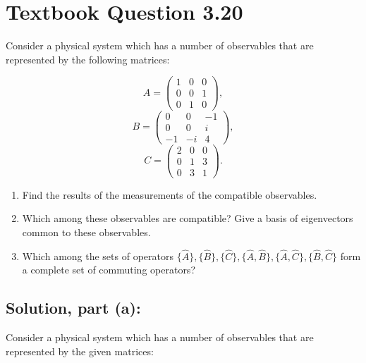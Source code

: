 \documentclass[12pt]{article}
\begin{document}
\section{Textbook Question 3.20}
    Consider a physical system which has a number of observables that are represented by the following matrices:

    \[
        A = \begin{pmatrix}
        1 & 0 & 0 \\
        0 & 0 & 1 \\
        0 & 1 & 0
        \end{pmatrix},
    \]
    \[
        B = \begin{pmatrix}
        0 & 0 & -1 \\
        0 & 0 & i \\
        -1 & -i & 4
        \end{pmatrix},
    \]
    \[
        C = \begin{pmatrix}
        2 & 0 & 0 \\
        0 & 1 & 3 \\
        0 & 3 & 1
        \end{pmatrix}.
    \]
    
    \begin{enumerate}
        \item[(a)] Find the results of the measurements of the compatible observables.
        
        \item[(b)] Which among these observables are compatible? Give a basis of eigenvectors common to these observables.
        
        \item[(c)] Which among the sets of operators \( \{\hat{A}\}, \{\hat{B}\}, \{\hat{C}\}, \{\hat{A}, \hat{B}\}, \{\hat{A}, \hat{C}\}, \{\hat{B}, \hat{C}\} \) form a complete set of commuting operators?
    \end{enumerate}

    \subsection{Solution, part (a):}
        Consider a physical system which has a number of observables that are represented by the given matrices:
        
\end{document}
